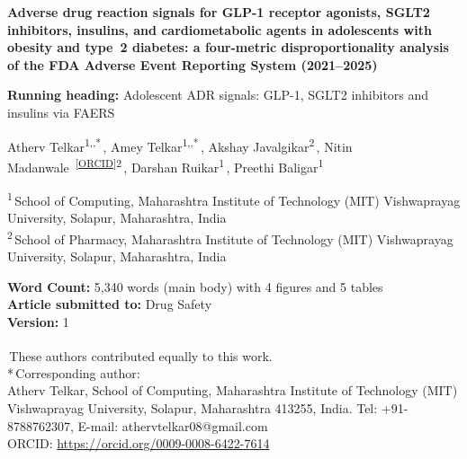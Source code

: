 \documentclass[10pt,a4paper]{article}
\begin{document}
\linenumbers
\thispagestyle{plain}

\begin{center}
{\Large\bfseries Adverse drug reaction signals for GLP-1 receptor agonists, SGLT2 inhibitors, insulins, and cardiometabolic agents in adolescents with obesity and type~2 diabetes: a four-metric disproportionality analysis of the FDA Adverse Event Reporting System (2021--2025)\par}
\vspace{12pt}

{\normalsize\textbf{Running heading:} Adolescent ADR signals: GLP-1, SGLT2 inhibitors and insulins via FAERS\par}
\vspace{10pt}

{\normalsize
Atherv Telkar\textsuperscript{1,\dag,*}\,,
Amey Telkar\textsuperscript{1,\dag,*}\,,
Akshay Javalgikar\textsuperscript{2}\,,
Nitin Madanwale~\textsuperscript{\href{https://orcid.org/0009-0007-9693-8501}{[ORCID]}}\textsuperscript{2}\,,
Darshan Ruikar\textsuperscript{1}\,,
Preethi Baligar\textsuperscript{1}\par}
\vspace{8pt}

{\small
\textsuperscript{1}\,School of Computing, Maharashtra Institute of Technology
(MIT) Vishwaprayag University, Solapur, Maharashtra, India\\
\textsuperscript{2}\,School of Pharmacy, Maharashtra Institute of Technology
(MIT) Vishwaprayag University, Solapur, Maharashtra, India\par}
\vspace{6pt}

{\small
\textbf{Word Count:} 5,340 words (main body) with 4 figures and 5 tables\\
\textbf{Article submitted to:} Drug Safety\\
\textbf{Version:} 1\par}
\vspace{6pt}
{\footnotesize
\textsuperscript{\dag}\,These authors contributed equally to this work.\\
*\,Corresponding author:\\
Atherv Telkar, School of Computing, Maharashtra Institute of Technology (MIT) Vishwaprayag University, Solapur, Maharashtra 413255, India. Tel: +91-8788762307, E-mail: athervtelkar08@gmail.com\\
ORCID: \url{https://orcid.org/0009-0008-6422-7614}\par}
\end{center}
\vspace{10pt}
\end{document}
